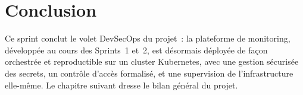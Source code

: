 \section*{Conclusion}

Ce sprint conclut le volet DevSecOps du projet~: la plateforme de monitoring, développée au cours des Sprints~1 et~2, est désormais déployée de façon orchestrée et reproductible sur un cluster Kubernetes, avec une gestion sécurisée des secrets, un contrôle d'accès formalisé, et une supervision de l'infrastructure elle-même. Le chapitre suivant dresse le bilan général du projet.
